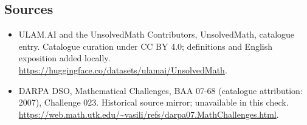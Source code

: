 \documentclass[11pt]{article}
\begin{document}
\subsection{Sources}
\begin{itemize}
\item[\hypertarget{source:statement:1}{S1}] ULAM.AI and the UnsolvedMath Contributors, UnsolvedMath, catalogue entry. Catalogue curation under CC BY 4.0; definitions and English exposition added locally.
\url{https://huggingface.co/datasets/ulamai/UnsolvedMath}.
\item[\hypertarget{source:statement:2}{S2}] DARPA DSO, Mathematical Challenges, BAA 07-68 (catalogue attribution: 2007), Challenge 023. Historical source mirror; unavailable in this check.
\url{https://web.math.utk.edu/~vasili/refs/darpa07.MathChallenges.html}.
\end{itemize}
\label{end:statement}
\end{document}
